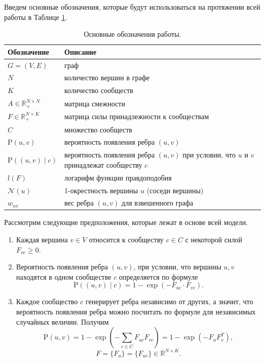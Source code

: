 \documentclass{ITaSconf}
\def\PP{\mathrm{P}}
\begin{document}
	Введем основные обозначения, которые будут использоваться на протяжении всей работы в Таблице \ref{table:notation}. 
	\begin{table}[!t]
		{
			\centering
			\small
			\begin{tabular}{ p{5.5em} p{17.5em} }
				\hline
				\hline
				Обозначение 						& Описание \\
				\hline
				$G = (V,E) $ 						& граф \\
				$N$									& количество вершин в графе \\
				$K$									& количество сообществ \\
				$A \in \mathbb{R}_{+}^{N\times N}$  & матрица смежности \\
				$F \in \mathbb{R}_{+}^{N\times K}$  & матрица силы принадлежности к сообществам			\\
				$C$									& множество сообществ \\
				$\PP(u,v)$							& вероятность появления ребра $(u,v)$ \\
				$\PP((u,v) \mid c)$ 					& вероятность появления ребра $(u,v)$ при условии, что $u$ и $v$ принадлежат сообществу $c$ \\
				
				$l(F)$								& логарифм функции правдоподобия \\
				$\mathcal{N}(u)$ 					& 1-окрестность вершины $u$ (соседи вершины) \\
				$w_{uv}$							& вес ребра $(u,v)$ для взвешенного графа \\
				\hline
				\hline
			\end{tabular}
		}
		\caption{Основные обозначения работы.}
		\label{table:notation}
	\end{table}
	Рассмотрим следующие предположения, которые лежат в основе всей модели.
	\begin{enumerate}
		\item Каждая вершина $v\in V$ относится к сообществу $c \in C$ с некоторой силой
		$F_{vc} \ge 0.$
		\item Вероятность появления ребра $(u,v)$, при условии, что вершины $u,v$ находятся в одном сообществе $c$ определяется по формуле 
		$$\PP((u,v) \mid c)=1 - \exp(-F_{uc}\cdot F_{vc}).$$
		\item Каждое сообщество $c$ генерирует ребра независимо от других, а значит, что вероятность появления ребра можно посчитать по формуле для независимых случайных величин. Получим
		$$\PP(u,v)=1 - \exp(-\sum_{c\in C} F_{uc} F_{vc}) = 1 - \exp( - F_{u} F_{v}^T),$$
		$$F = \{F_u\} = \{F_{uc}\} \in \mathbb {R}^{N \times K}. $$
	\end{enumerate}
	
\end{document}
